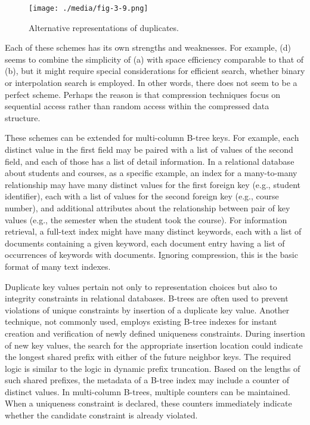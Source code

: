 \begin{figure}
  \centering
  \texttt{[image: ./media/fig-3-9.png]}

  \caption{Alternative representations of duplicates.\label{fig-3-9}}
\end{figure}

Each of these schemes has its own strengths and weaknesses. For example,
(d) seems to combine the simplicity of (a) with space efficiency
comparable to that of (b), but it might require special considerations
for efficient search, whether binary or interpolation search is
employed. In other words, there does not seem to be a perfect scheme.
Perhaps the reason is that compression techniques focus on sequential
access rather than random access within the compressed data structure.

These schemes can be extended for multi-column B-tree keys. For example,
each distinct value in the first field may be paired with a list of
values of the second field, and each of those has a list of detail
information. In a relational database about students and courses, as a
specific example, an index for a many-to-many relationship may have many
distinct values for the first foreign key (e.g., student identifier),
each with a list of values for the second foreign key (e.g., course
number), and additional attributes about the relationship between pair
of key values (e.g., the semester when the student took the course). For
information retrieval, a full-text index might have many distinct
keywords, each with a list of documents containing a given keyword, each
document entry having a list of occurrences of keywords with documents.
Ignoring compression, this is the basic format of many text indexes.

Duplicate key values pertain not only to representation choices but also
to integrity constraints in relational databases. B-trees are often used
to prevent violations of unique constraints by insertion of a duplicate
key value. Another technique, not commonly used, employs existing B-tree
indexes for instant creation and verification of newly defined
uniqueness constraints. During insertion of new key values, the search
for the appropriate insertion location could indicate the longest shared
prefix with either of the future neighbor keys. The required logic is
similar to the logic in dynamic prefix truncation. Based on the lengths
of such shared prefixes, the metadata of a B-tree index may include a
counter of distinct values. In multi-column B-trees, multiple counters
can be maintained. When a uniqueness constraint is declared, these
counters immediately indicate whether the candidate constraint is
already violated.

